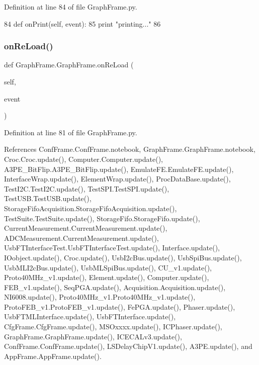 Definition at line 84 of file Graph\+Frame.\+py.


\begin{DoxyCode}
84     \textcolor{keyword}{def }onPrint(self, event):
85         \textcolor{keywordflow}{print} \textcolor{stringliteral}{"printing..."}
86 
\end{DoxyCode}
\mbox{\label{classGraphFrame_1_1GraphFrame_a7b18d46fe532780e2cb335195d245a46}} 
\subsubsection{\texorpdfstring{on\+Re\+Load()}{onReLoad()}}
{\footnotesize\ttfamily def Graph\+Frame.\+Graph\+Frame.\+on\+Re\+Load (\begin{DoxyParamCaption}\item[{}]{self,  }\item[{}]{event }\end{DoxyParamCaption})}



Definition at line 81 of file Graph\+Frame.\+py.



References Conf\+Frame.\+Conf\+Frame.\+notebook, Graph\+Frame.\+Graph\+Frame.\+notebook, Croc.\+Croc.\+update(), Computer.\+Computer.\+update(), A3\+P\+E\+\_\+\+Bit\+Flip.\+A3\+P\+E\+\_\+\+Bit\+Flip.\+update(), Emulate\+F\+E.\+Emulate\+F\+E.\+update(), Interface\+Wrap.\+update(), Element\+Wrap.\+update(), Proc\+Data\+Base.\+update(), Test\+I2\+C.\+Test\+I2\+C.\+update(), Test\+S\+P\+I.\+Test\+S\+P\+I.\+update(), Test\+U\+S\+B.\+Test\+U\+S\+B.\+update(), Storage\+Fifo\+Acquisition.\+Storage\+Fifo\+Acquisition.\+update(), Test\+Suite.\+Test\+Suite.\+update(), Storage\+Fifo.\+Storage\+Fifo.\+update(), Current\+Measurement.\+Current\+Measurement.\+update(), A\+D\+C\+Measurement.\+Current\+Measurement.\+update(), Usb\+F\+T\+Interface\+Test.\+Usb\+F\+T\+Interface\+Test.\+update(), Interface.\+update(), I\+Oobject.\+update(), Croc.\+update(), Usb\+I2c\+Bus.\+update(), Usb\+Spi\+Bus.\+update(), Usb\+M\+L\+I2c\+Bus.\+update(), Usb\+M\+L\+Spi\+Bus.\+update(), C\+U\+\_\+v1.\+update(), Proto40\+M\+Hz\+\_\+v1.\+update(), Element.\+update(), Computer.\+update(), F\+E\+B\+\_\+v1.\+update(), Seq\+P\+G\+A.\+update(), Acquisition.\+Acquisition.\+update(), N\+I6008.\+update(), Proto40\+M\+Hz\+\_\+v1.\+Proto40\+M\+Hz\+\_\+v1.\+update(), Proto\+F\+E\+B\+\_\+v1.\+Proto\+F\+E\+B\+\_\+v1.\+update(), Fe\+P\+G\+A.\+update(), Phaser.\+update(), Usb\+F\+T\+M\+L\+Interface.\+update(), Usb\+F\+T\+Interface.\+update(), Cfg\+Frame.\+Cfg\+Frame.\+update(), M\+S\+Oxxxx.\+update(), I\+C\+Phaser.\+update(), Graph\+Frame.\+Graph\+Frame.\+update(), I\+C\+E\+C\+A\+Lv3.\+update(), Conf\+Frame.\+Conf\+Frame.\+update(), L\+S\+Delay\+Chip\+V1.\+update(), A3\+P\+E.\+update(), and App\+Frame.\+App\+Frame.\+update().


